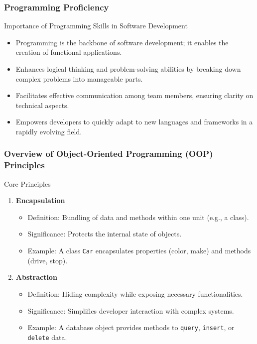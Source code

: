 \documentclass{beamer}
\begin{document}
\begin{frame}[fragile]
    \frametitle{Programming Proficiency}
    \begin{block}{Importance of Programming Skills in Software Development}
        \begin{itemize}
            \item Programming is the backbone of software development; it enables the creation of functional applications.
            \item Enhances logical thinking and problem-solving abilities by breaking down complex problems into manageable parts.
            \item Facilitates effective communication among team members, ensuring clarity on technical aspects.
            \item Empowers developers to quickly adapt to new languages and frameworks in a rapidly evolving field.
        \end{itemize}
    \end{block}
\end{frame}

\begin{frame}[fragile]
    \frametitle{Overview of Object-Oriented Programming (OOP) Principles}
    \begin{block}{Core Principles}
        \begin{enumerate}
            \item \textbf{Encapsulation}
                \begin{itemize}
                    \item Definition: Bundling of data and methods within one unit (e.g., a class).
                    \item Significance: Protects the internal state of objects.
                    \item Example: A class \texttt{Car} encapsulates properties (color, make) and methods (drive, stop).
                \end{itemize}
            \item \textbf{Abstraction}
                \begin{itemize}
                    \item Definition: Hiding complexity while exposing necessary functionalities.
                    \item Significance: Simplifies developer interaction with complex systems.
                    \item Example: A database object provides methods to \texttt{query}, \texttt{insert}, or \texttt{delete} data.
                \end{itemize}
        \end{enumerate}
    \end{block}
\end{frame}
\end{document}
